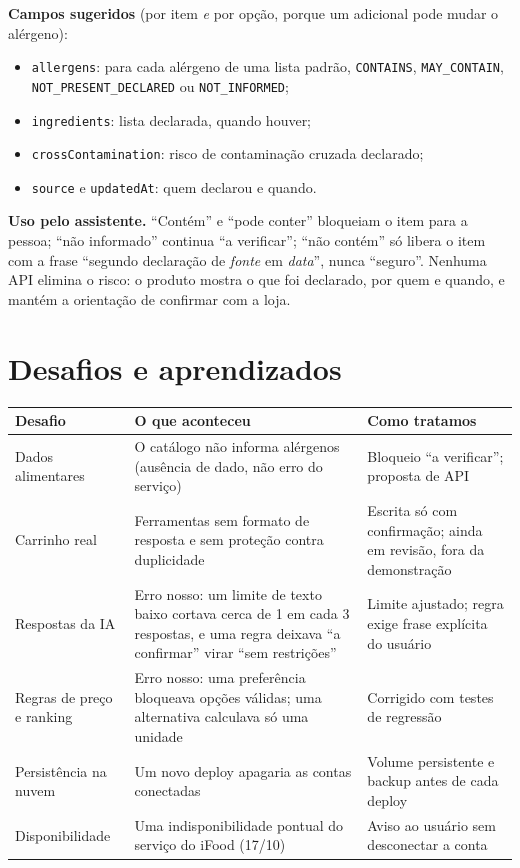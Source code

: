 \documentclass[11pt,a4paper]{article}
\newif\ifcenarioA
\begin{document}
\textbf{Campos sugeridos} (por item \emph{e} por opção, porque um adicional pode mudar o alérgeno):
\begin{itemize}
  \item \texttt{allergens}: para cada alérgeno de uma lista padrão, \texttt{CONTAINS}, \texttt{MAY\_CONTAIN}, \texttt{NOT\_PRESENT\_DECLARED} ou \texttt{NOT\_INFORMED};
  \item \texttt{ingredients}: lista declarada, quando houver;
  \item \texttt{crossContamination}: risco de contaminação cruzada declarado;
  \item \texttt{source} e \texttt{updatedAt}: quem declarou e quando.
\end{itemize}

\textbf{Uso pelo assistente.} ``Contém'' e ``pode conter'' bloqueiam o item para a pessoa; ``não informado'' continua ``a verificar''; ``não contém'' só libera o item com a frase ``segundo declaração de \emph{fonte} em \emph{data}'', nunca ``seguro''. Nenhuma API elimina o risco: o produto mostra o que foi declarado, por quem e quando, e mantém a orientação de confirmar com a loja.

\ifcenarioA\else
\section{Desafios e aprendizados}\label{sec:aprendizados}

\begin{center}
\small
\begin{tabularx}{\linewidth}{>{\raggedright}p{3.2cm}Y>{\raggedright\arraybackslash}p{3.6cm}}
\toprule
\textbf{Desafio} & \textbf{O que aconteceu} & \textbf{Como tratamos} \\
\midrule
Dados alimentares & O catálogo não informa alérgenos (ausência de dado, não erro do serviço) & Bloqueio ``a verificar''; proposta de API \\
Carrinho real & Ferramentas sem formato de resposta e sem proteção contra duplicidade & Escrita só com confirmação; ainda em revisão, fora da demonstração \\
Respostas da IA & Erro nosso: um limite de texto baixo cortava cerca de 1 em cada 3 respostas, e uma regra deixava ``a confirmar'' virar ``sem restrições'' & Limite ajustado; regra exige frase explícita do usuário \\
Regras de preço e ranking & Erro nosso: uma preferência bloqueava opções válidas; uma alternativa calculava só uma unidade & Corrigido com testes de regressão \\
Persistência na nuvem & Um novo deploy apagaria as contas conectadas & Volume persistente e backup antes de cada deploy \\
Disponibilidade & Uma indisponibilidade pontual do serviço do iFood (17/10) & Aviso ao usuário sem desconectar a conta \\
\bottomrule
\end{tabularx}
\end{center}
\end{document}
